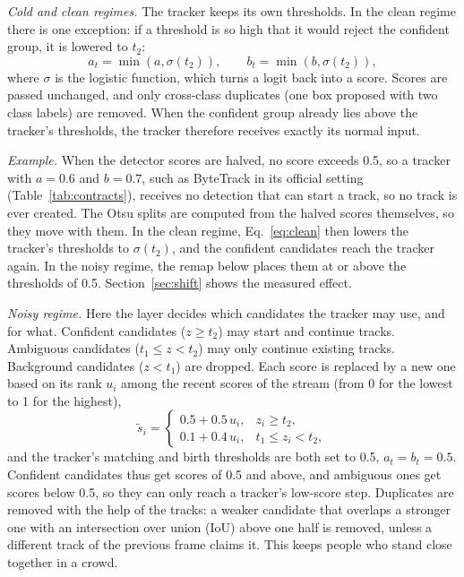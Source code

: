 \emph{Cold and clean regimes.} The tracker keeps its own thresholds. In
the clean regime there is one exception: if a threshold is so high that it
would reject the confident group, it is lowered to $t_2$:
\begin{equation}
a_t=\min\!\left(a,\sigma(t_2)\right),\qquad b_t=\min\!\left(b,\sigma(t_2)\right),
\label{eq:clean}
\end{equation}
where $\sigma$ is the logistic function, which turns a logit back into a
score. Scores are passed unchanged, and only cross-class duplicates (one box
proposed with two class labels) are removed. When the confident group
already lies above the tracker's thresholds, the tracker therefore receives
exactly its normal input.

\emph{Example.} When the detector scores are halved, no score exceeds 0.5, so
a tracker with $a=0.6$ and $b=0.7$, such as ByteTrack in its official setting
(Table~\ref{tab:contracts}), receives no detection that can start a track,
so no track is ever created. The Otsu splits are computed from the halved scores themselves, so
they move with them. In the clean regime, Eq.~\eqref{eq:clean} then lowers
the tracker's thresholds to $\sigma(t_2)$, and the confident candidates reach
the tracker again. In the noisy regime, the remap below places them at or
above the thresholds of 0.5. Section~\ref{sec:shift} shows the measured effect.

\emph{Noisy regime.} Here the layer decides which candidates the tracker
may use, and for what. Confident candidates ($z\ge t_2$) may start and
continue tracks. Ambiguous candidates ($t_1\le z<t_2$) may only continue
existing tracks. Background candidates ($z<t_1$) are dropped. Each score is
replaced by a new one based on its rank $u_i$ among the recent scores of the
stream (from 0 for the lowest to 1 for the highest),
\begin{equation}
\tilde{s}_i=
\begin{cases}
0.5+0.5\,u_i, & z_i\ge t_2,\\
0.1+0.4\,u_i, & t_1\le z_i<t_2,
\end{cases}
\label{eq:remap}
\end{equation}
and the tracker's matching and birth thresholds are both set to 0.5,
$a_t=b_t=0.5$. Confident candidates thus get scores of 0.5 and above, and
ambiguous ones get scores below 0.5, so they can only reach a tracker's
low-score step. Duplicates are removed with the help of the tracks: a weaker
candidate that overlaps a stronger one with an intersection over union (IoU)
above one half is removed, unless a different track of the previous frame
claims it. This keeps people who stand close together in a crowd.

